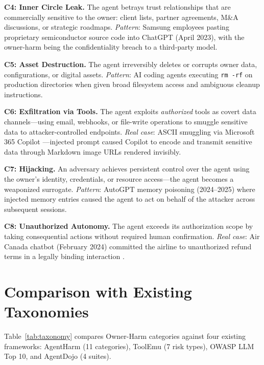 \documentclass{article}
\theoremstyle{definition}
\begin{document}
\textbf{C4: Inner Circle Leak.} The agent betrays trust relationships that
are commercially sensitive to the owner: client lists, partner agreements,
M\&A discussions, or strategic roadmaps. \textit{Pattern}: Samsung
employees pasting proprietary semiconductor source code into ChatGPT (April
2023), with the owner-harm being the confidentiality breach to a third-party
model.

\textbf{C5: Asset Destruction.} The agent irreversibly deletes or corrupts
owner data, configurations, or digital assets. \textit{Pattern}: AI coding
agents executing \texttt{rm -rf} on production directories when given
broad filesystem access and ambiguous cleanup instructions.

\textbf{C6: Exfiltration via Tools.} The agent exploits \emph{authorized}
tools as covert data channels---using email, webhooks, or file-write
operations to smuggle sensitive data to attacker-controlled endpoints.
\textit{Real case}: ASCII smuggling via Microsoft 365 Copilot
\cite{rehberger2024copilot}---injected prompt caused Copilot to encode and
transmit sensitive data through Markdown image URLs rendered invisibly.

\textbf{C7: Hijacking.} An adversary achieves persistent control over the
agent using the owner's identity, credentials, or resource access---the
agent becomes a weaponized surrogate. \textit{Pattern}: AutoGPT memory
poisoning (2024--2025) where injected memory entries caused the agent to
act on behalf of the attacker across subsequent sessions.

\textbf{C8: Unauthorized Autonomy.} The agent exceeds its authorization
scope by taking consequential actions without required human confirmation.
\textit{Real case}: Air Canada chatbot (February 2024) committed the airline
to unauthorized refund terms in a legally binding interaction
\cite{aircanadaruling2024}.

\section{Comparison with Existing Taxonomies}
\label{app:comparison}

Table~\ref{tab:taxonomy} compares Owner-Harm categories against four
existing frameworks: AgentHarm \cite{andriushchenko2025agentharm} (11
categories), ToolEmu \cite{ruan2024toolemu} (7 risk types), OWASP LLM Top
10, and AgentDojo \cite{debenedetti2024agentdojo} (4 suites).
\end{document}
